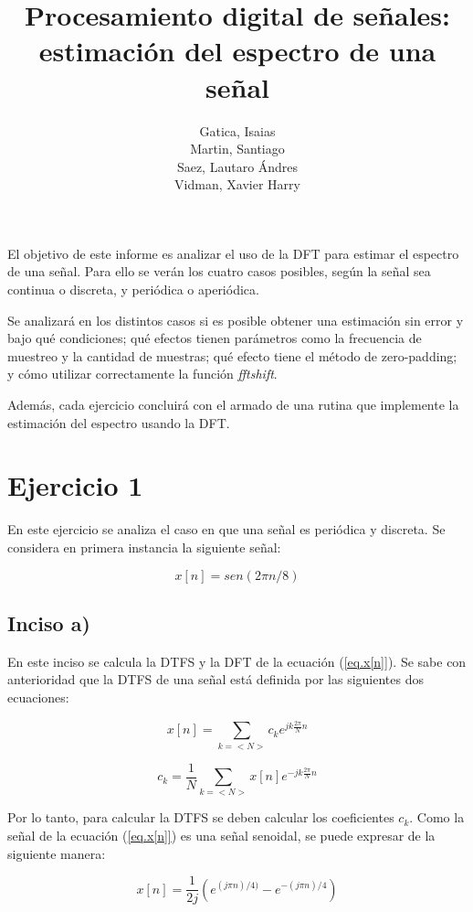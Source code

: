 \documentclass{article}
\author{Gatica, Isaias \\ Martin, Santiago \\ Saez, Lautaro Ándres \\ Vidman, Xavier Harry}
\title{Procesamiento digital de señales: estimación del espectro de una señal}
\date{}
\begin{document}
\maketitle
El objetivo de este informe es analizar el uso de la DFT para estimar el espectro de una señal. Para ello se verán los cuatro casos posibles, según la señal sea continua o discreta, y periódica o aperiódica.


Se analizará en los distintos casos si es posible obtener una estimación sin error y bajo qué condiciones; qué efectos tienen parámetros como la frecuencia de muestreo y la cantidad de muestras; qué efecto tiene el método de zero-padding; y cómo utilizar correctamente la función \textit{fftshift}.


Además, cada ejercicio concluirá con el armado de una rutina que implemente la estimación del espectro usando la DFT.


\section{Ejercicio 1}
En este ejercicio se analiza el caso en que una señal es periódica y discreta. Se considera en primera instancia la siguiente señal: 

\begin{equation}
x[n]=sen(2 \pi n /8)
\label{eq.x[n]}
\end{equation}

\subsection*{Inciso a)}
En este inciso se calcula la DTFS y la DFT de la ecuación (\ref{eq.x[n]}). Se sabe con anterioridad que la DTFS de una señal está definida por las siguientes dos ecuaciones:

\begin{equation}
x[n] = \sum_{k=<N>}^{} c_{k} e^{jk \frac{2 \pi}{N} n}
\end{equation}

\begin{equation}
c_{k} = \frac{1}{N} \sum_{k=<N>}^{} x[n] e^{-jk \frac{2 \pi}{N} n}
\end{equation}	

Por lo tanto, para calcular la DTFS se deben calcular los coeficientes $c_{k}$. Como la señal de la ecuación (\ref{eq.x[n]}) es una señal senoidal, se puede expresar de la siguiente manera:

\begin{equation}
x[n]= \frac{1}{2j} \left( e^{(j \pi n)/4)}-e^{-(j \pi n)/4} \right)
\end{equation}
\end{document}
